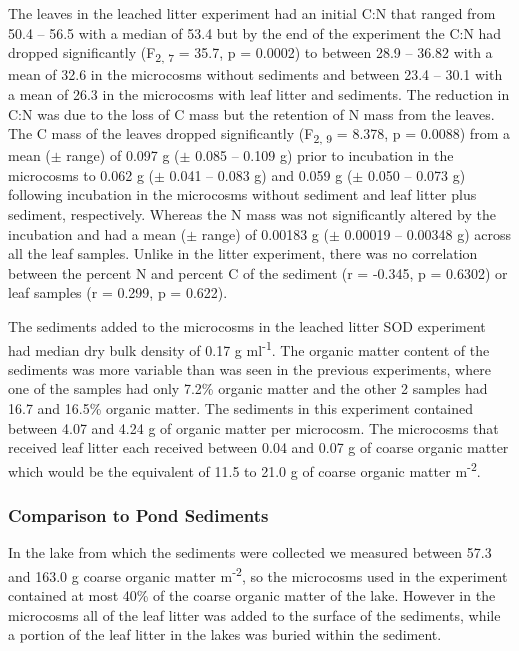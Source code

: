The leaves in the leached litter experiment had an initial C:N that ranged from 50.4 -- 56.5 with a median of 53.4 but by the end of the experiment the C:N had dropped significantly (F\textsubscript{2, 7} = 35.7, p = 0.0002) to between 28.9 -- 36.82 with a mean of 32.6 in the microcosms without sediments and between 23.4 -- 30.1 with a mean of 26.3 in the microcosms with leaf litter and sediments. The reduction in C:N was due to the loss of C mass but the retention of N mass from the leaves. The C mass of the leaves dropped significantly (F\textsubscript{2, 9} = 8.378, p = 0.0088) from a mean ($\pm$ range) of 0.097 g ($\pm$ 0.085 -- 0.109 g) prior to incubation in the microcosms to 0.062 g ($\pm$ 0.041 -- 0.083 g) and 0.059 g ($\pm$ 0.050 -- 0.073 g) following incubation in the microcosms without sediment and leaf litter plus sediment, respectively. Whereas the N mass was not significantly altered by the incubation and had a mean ($\pm$ range) of 0.00183 g ($\pm$ 0.00019 -- 0.00348 g) across all the leaf samples. Unlike in the litter experiment, there was no correlation between the percent N and percent C of the sediment (r = -0.345, p = 0.6302) or leaf samples (r = 0.299, p = 0.622).

The sediments added to the microcosms in the leached litter SOD experiment had  median dry bulk density of 0.17 g ml\textsuperscript{-1}. The organic matter content of the sediments was more variable than was seen in the previous experiments, where one of the samples had only 7.2\% organic matter and the other 2 samples had 16.7 and 16.5\% organic matter. The sediments in this experiment contained between 4.07 and 4.24 g of organic matter per microcosm. The microcosms that received leaf litter each received between 0.04 and 0.07 g of coarse organic matter which would be the equivalent of 11.5 to 21.0 g of coarse organic matter m\textsuperscript{-2}.

\subsubsection{Comparison to Pond Sediments}
In the lake from which the sediments were collected we measured between 57.3 and 163.0 g coarse organic matter m\textsuperscript{-2}, so the microcosms used in the experiment contained at most 40\% of the coarse organic matter of the lake. However in the microcosms all of the leaf litter was added to the surface of the sediments, while a portion of the leaf litter in the lakes was buried within the sediment.

